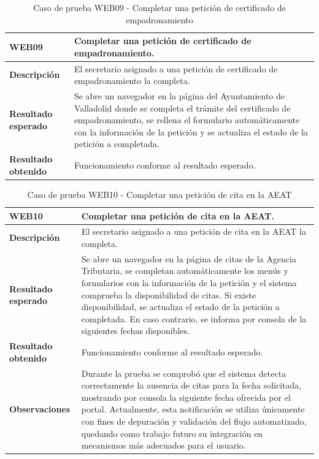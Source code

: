     \begin{table}[H]
        \centering
        \begin{tabular}{|l|p{12cm}|}
        \hline
        \textbf{WEB09} & Completar una petición de certificado de empadronamiento. \\ \hline
        \textbf{Descripción} & El secretario asignado a una petición de certificado de empadronamiento la completa. \\ \hline
        \textbf{Resultado esperado} & Se abre un navegador en la página del Ayuntamiento de Valladolid donde se completa el trámite del certificado de empadronamiento, se rellena el formulario automáticamente con la información de la petición y se actualiza el estado de la petición a completada. \\ \hline
        \textbf{Resultado obtenido} & Funcionamiento conforme al resultado esperado. \\ \hline
        \end{tabular}
        \caption{Caso de prueba WEB09 - Completar una petición de certificado de empadronamiento}
        \label{tab:6.9}
    \end{table}

    \begin{table}[H]
        \centering
        \begin{tabular}{|l|p{12cm}|}
        \hline
        \textbf{WEB10} & Completar una petición de cita en la AEAT. \\ \hline
        \textbf{Descripción} & El secretario asignado a una petición de cita en la AEAT la completa. \\ \hline
        \textbf{Resultado esperado} & Se abre un navegador en la página de citas de la Agencia Tributaria, se completan automáticamente los menús y formularios con la información de la petición y el sistema comprueba la disponibilidad de citas. 
            Si existe disponibilidad, se actualiza el estado de la petición a completada. 
            En caso contrario, se informa por consola de la siguientes fechas disponibles. \\ \hline
        \textbf{Resultado obtenido} & Funcionamiento conforme al resultado esperado. \\ \hline
        \textbf{Observaciones} & Durante la prueba se comprobó que el sistema detecta correctamente la ausencia de citas para la fecha solicitada, mostrando por consola la siguiente fecha ofrecida por el portal. 
            Actualmente, esta notificación se utiliza únicamente con fines de depuración y validación del flujo automatizado, quedando como trabajo futuro su integración en mecanismos más adecuados para el usuario. \\ \hline
        \end{tabular}
        \caption{Caso de prueba WEB10 - Completar una petición de cita en la AEAT}
        \label{tab:6.10}
    \end{table}

